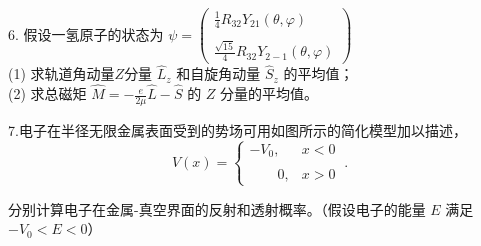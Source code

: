 6. 假设一氢原子的状态为
$\psi = \begin{pmatrix}\frac{1}{4} R_{32}  Y_{21}(\theta, \varphi) \\\\\frac{\sqrt{15}}{4} R_{32}  Y_{2-1}(\theta, \varphi)\end{pmatrix}$\\
(1) 求轨道角动量$Z$分量 $\hat{L}_z$ 和自旋角动量 $\hat{S}_z$ 的平均值；\\
(2) 求总磁矩 $\hat{M} = -\frac{e}{2\mu}\hat{L} - \hat{S}$ 的 $  Z$ 分量的平均值。

7.电子在半径无限金属表面受到的势场可用如图所示的简化模型加以描述，
\begin{equation}
V(x) =
\begin{cases}
 -V_0,& x < 0 \\\\
\qquad0, & x > 0
\end{cases}~.
\end{equation}

分别计算电子在金属-真空界面的反射和透射概率。（假设电子的能量 $E$ 满足 $-V_0 < E < 0$）
